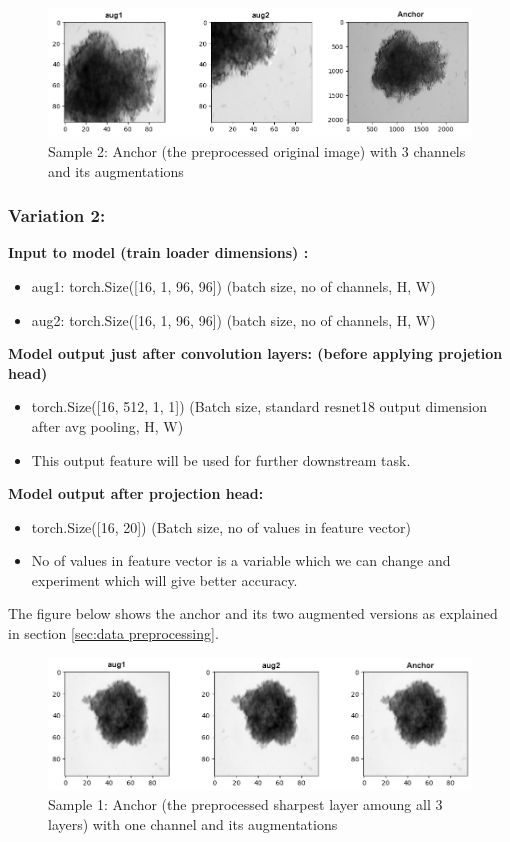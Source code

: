   \begin{figure}[H]
    \centering
    \includegraphics[width=0.9\linewidth]{figures/3_2fine.png} %
    \caption{Sample 2: Anchor (the preprocessed original image) with 3 channels and its augmentations}
    \label{fig:augmentations}
  \end{figure}
\subsubsection{Variation 2:}

\textbf{Input to model (train loader dimensions) :} 
\begin{itemize}
   \item aug1: torch.Size([16, 1, 96, 96])        (batch size, no of channels, H, W)
   \item aug2: torch.Size([16, 1, 96, 96])        (batch size, no of channels, H, W) \vspace{1em}
\end{itemize}
\textbf{Model output just after convolution layers: (before applying projetion head)} 
\begin{itemize}
  \item torch.Size([16, 512, 1, 1]) (Batch size, standard resnet18 output dimension after avg pooling, H, W)   
  \item This output feature will be used for further downstream task.  \vspace{1em}
\end{itemize}

\textbf{Model output after projection head:}
\begin{itemize}
  \item torch.Size([16, 20])  (Batch size, no of values in feature vector)  
  \item No of values in feature vector is a variable which we can change and experiment which will give better accuracy.
\end{itemize}

The figure below shows the anchor and its two augmented versions as explained in section \ref{sec:data preprocessing}.
\begin{figure}[H]
  \centering
  \includegraphics[width=0.9\linewidth]{figures/1_1.png} %
  \caption{Sample 1: Anchor (the preprocessed sharpest layer amoung all 3 layers) with one channel and its augmentations}
  \label{fig:1doutput1}
\end{figure}

